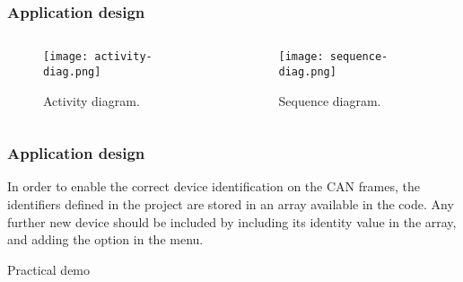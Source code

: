 \begin{frame}
	\frametitle{Application design}
	\begin{columns}
		\begin{column}{0.5\textwidth}
			\begin{figure}
				\texttt{[image: activity-diag.png]}
				\caption{Activity diagram.}\label{fig:activity-diag}
			\end{figure}
		\end{column} \pause
		\begin{column}{0.5\textwidth}
			\begin{figure}
				\texttt{[image: sequence-diag.png]}
				\caption{Sequence diagram.}\label{fig:sequence-diag}
			\end{figure}
		\end{column}
	\end{columns}
\end{frame}

\begin{frame}
	\frametitle{Application design}
	In order to enable the correct device identification on the CAN frames, the identifiers defined in the project are stored in an array available in the code. Any further new device should be included by including its identity value in the array, and adding the option in the menu.
	\vfill
	
\end{frame}

\begin{frame}[standout]
	\LARGE Practical demo
\end{frame}